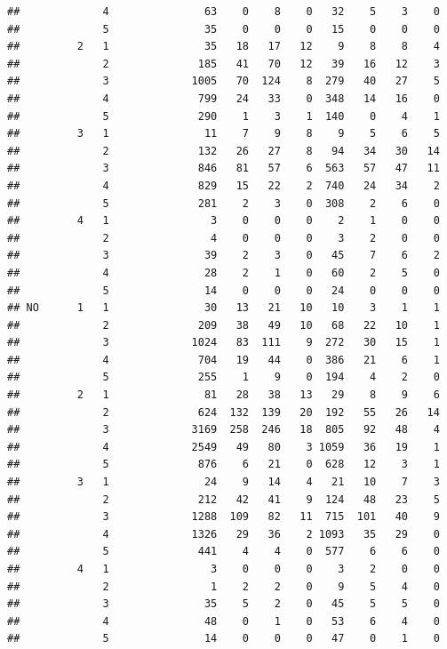 \documentclass{article}\usepackage[]{graphicx}\usepackage[]{xcolor}
\makeatletter
\newenvironment{kframe}{%
 \def\at@end@of@kframe{}%
 \ifinner\ifhmode%
  \def\at@end@of@kframe{\end{minipage}}%
  \begin{minipage}{\columnwidth}%
 \fi\fi%
 \def\FrameCommand##1{\hskip\@totalleftmargin \hskip-\fboxsep
 \colorbox{shadecolor}{##1}\hskip-\fboxsep
     \hskip-\linewidth \hskip-\@totalleftmargin \hskip\columnwidth}%
 \MakeFramed {\advance\hsize-\width
   \@totalleftmargin\z@ \linewidth\hsize
   \@setminipage}}%
 {\par\unskip\endMakeFramed%
 \at@end@of@kframe}
\newenvironment{knitrout}{}{} %
\makeatother
\begin{document}
\begin{knitrout}
\begin{kframe}
\begin{verbatim}
##             4               63    0    8    0   32    5    3    0
##             5               35    0    0    0   15    0    0    0
##         2   1               35   18   17   12    9    8    8    4
##             2              185   41   70   12   39   16   12    3
##             3             1005   70  124    8  279   40   27    5
##             4              799   24   33    0  348   14   16    0
##             5              290    1    3    1  140    0    4    1
##         3   1               11    7    9    8    9    5    6    5
##             2              132   26   27    8   94   34   30   14
##             3              846   81   57    6  563   57   47   11
##             4              829   15   22    2  740   24   34    2
##             5              281    2    3    0  308    2    6    0
##         4   1                3    0    0    0    2    1    0    0
##             2                4    0    0    0    3    2    0    0
##             3               39    2    3    0   45    7    6    2
##             4               28    2    1    0   60    2    5    0
##             5               14    0    0    0   24    0    0    0
## NO      1   1               30   13   21   10   10    3    1    1
##             2              209   38   49   10   68   22   10    1
##             3             1024   83  111    9  272   30   15    1
##             4              704   19   44    0  386   21    6    1
##             5              255    1    9    0  194    4    2    0
##         2   1               81   28   38   13   29    8    9    6
##             2              624  132  139   20  192   55   26   14
##             3             3169  258  246   18  805   92   48    4
##             4             2549   49   80    3 1059   36   19    1
##             5              876    6   21    0  628   12    3    1
##         3   1               24    9   14    4   21   10    7    3
##             2              212   42   41    9  124   48   23    5
##             3             1288  109   82   11  715  101   40    9
##             4             1326   29   36    2 1093   35   29    0
##             5              441    4    4    0  577    6    6    0
##         4   1                3    0    0    0    3    2    0    0
##             2                1    2    2    0    9    5    4    0
##             3               35    5    2    0   45    5    5    0
##             4               48    0    1    0   53    6    4    0
##             5               14    0    0    0   47    0    1    0
\end{verbatim}
\end{kframe}
\end{knitrout}
    
\end{document}
